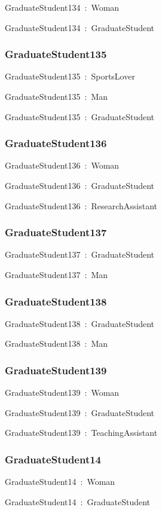 \documentclass{article}
\begin{document}
GraduateStudent134~:~Woman

GraduateStudent134~:~GraduateStudent

\subsubsection*{GraduateStudent135}

GraduateStudent135~:~SportsLover

GraduateStudent135~:~Man

GraduateStudent135~:~GraduateStudent

\subsubsection*{GraduateStudent136}

GraduateStudent136~:~Woman

GraduateStudent136~:~GraduateStudent

GraduateStudent136~:~ResearchAssistant

\subsubsection*{GraduateStudent137}

GraduateStudent137~:~GraduateStudent

GraduateStudent137~:~Man

\subsubsection*{GraduateStudent138}

GraduateStudent138~:~GraduateStudent

GraduateStudent138~:~Man

\subsubsection*{GraduateStudent139}

GraduateStudent139~:~Woman

GraduateStudent139~:~GraduateStudent

GraduateStudent139~:~TeachingAssistant

\subsubsection*{GraduateStudent14}

GraduateStudent14~:~Woman

GraduateStudent14~:~GraduateStudent
\end{document}
